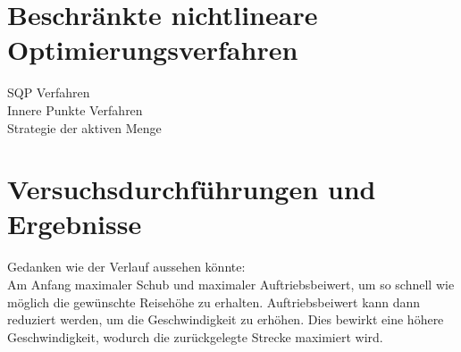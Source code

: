 














\section{Beschränkte nichtlineare Optimierungsverfahren}
SQP Verfahren \\
Innere Punkte Verfahren \\
Strategie der aktiven Menge













\section{Versuchsdurchführungen und Ergebnisse}
Gedanken wie der Verlauf aussehen könnte:\\
Am Anfang maximaler Schub und maximaler Auftriebsbeiwert, um so schnell wie möglich die gewünschte Reisehöhe zu erhalten. Auftriebsbeiwert kann dann reduziert werden, um die Geschwindigkeit zu erhöhen. Dies bewirkt eine höhere Geschwindigkeit, wodurch die zurückgelegte Strecke maximiert wird.


